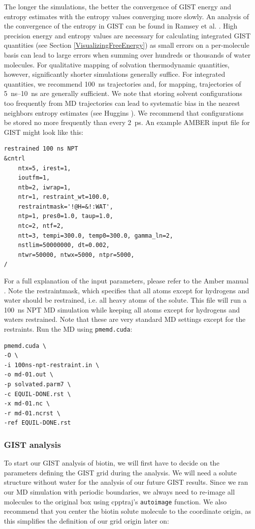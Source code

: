 \documentclass[9pt,tutorial,pubversion]{livecoms}
\newcommand{\software}{\texttt}
\newcommand\inlinecode{\texttt}
\begin{document}
The longer the simulations, the better the convergence of GIST energy and entropy estimates with the entropy values converging more slowly. 
An analysis of the convergence of the entropy in GIST can be found in Ramsey et al. \cite{Ramsey2016}. 
High precision energy and entropy values are necessary for calculating integrated GIST quantities (see Section \ref{VisualizingFreeEnergy}) as small errors on a per-molecule basis can lead to large errors when summing over hundreds or thousands of water molecules. 
For qualitative mapping of solvation thermodynamic quantities, however, significantly shorter simulations generally suffice. 
For integrated quantities, we recommend \qty{100}{\nano\second} trajectories and, for mapping, trajectories of \qtyrange{5}{10}{\nano\second} are generally sufficient. 
We note that storing solvent configurations too frequently from MD trajectories can lead to systematic bias in the nearest neighbors entropy estimates (see Huggins \cite{Huggins2014-entropy}).
We recommend that configurations be stored no more frequently than every \qty{2}{\pico\second}. 
An example AMBER input file for GIST might look like this:
\begin{lstlisting}[style=amber-in]
restrained 100 ns NPT
&cntrl
	ntx=5, irest=1,
	ioutfm=1,
	ntb=2, iwrap=1,
	ntr=1, restraint_wt=100.0,
	restraintmask='!@H=&!:WAT',
	ntp=1, pres0=1.0, taup=1.0,
	ntc=2, ntf=2,
	ntt=3, tempi=300.0, temp0=300.0, gamma_ln=2,
	nstlim=50000000, dt=0.002,
	ntwr=50000, ntwx=5000, ntpr=5000,
/
\end{lstlisting}
For a full explanation of the input parameters, please refer to the Amber manual \cite{amber24}.
Note the restraintmask, which specifies that all atoms except for hydrogens and water should be restrained, i.e. all heavy atoms of the solute.
This file will run a \qty{100}{\nano\second} NPT MD simulation while keeping all atoms except for hydrogens and waters restrained.
Note that these are very standard MD settings except for the restraints.
Run the MD using \software{pmemd.cuda}:
\begin{lstlisting}[style=bash]
pmemd.cuda \ 
-O \
-i 100ns-npt-restraint.in \
-o md-01.out \
-p solvated.parm7 \
-c EQUIL-DONE.rst \
-x md-01.nc \
-r md-01.ncrst \
-ref EQUIL-DONE.rst
\end{lstlisting}
\subsubsection{GIST analysis}

To start our GIST analysis of biotin, we will first have to decide on the parameters defining the GIST grid during the analysis.
We will need a solute structure without water for the analysis of our future GIST results. 
Since we ran our MD simulation with periodic boundaries, we always need to re-image all molecules to the original box using cpptraj's \inlinecode{autoimage} function. 
We also recommend that you center the biotin solute molecule to the coordinate origin, as this simplifies the definition of our grid origin later on:
\end{document}
